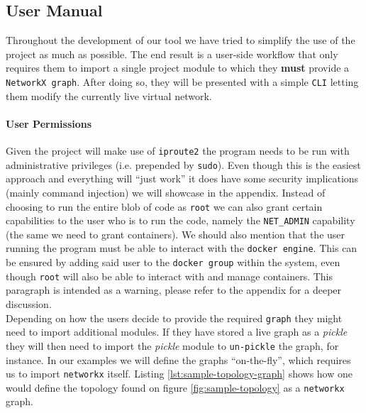         \subsection{User Manual} \label{sec:user-manual}
            Throughout the development of our tool we have tried to simplify the use of the project as much as possible. The end result is a user-side workflow that only requires them to import a single project module to which they \textbf{must} provide a \texttt{NetworkX graph}. After doing so, they will be presented with a simple \texttt{CLI} letting them modify the currently live virtual network.\\

            \paragraph{User Permissions}
                Given the project will make use of \texttt{iproute2} the program needs to be run with administrative privileges (i.e. prepended by \texttt{sudo}). Even though this is the easiest approach and everything will ``just work'' it does have some security implications (mainly command injection) we will showcase in the appendix. Instead of choosing to run the entire blob of code as \texttt{root} we can also grant certain capabilities to the user who is to run the code, namely the \texttt{NET\_ADMIN} capability (the same we need to grant containers). We should also mention that the user running the program must be able to interact with the \texttt{docker engine}. This can be ensured by adding said user to the \texttt{docker group} within the system, even though \texttt{root} will also be able to interact with and manage containers. This paragraph is intended as a warning, please refer to the appendix for a deeper discussion.\\

            Depending on how the users decide to provide the required \texttt{graph} they might need to import additional modules. If they have stored a live graph as a \textit{pickle} \cite{bib:python-pickle} they will then need to import the \textit{pickle} module to \texttt{un-pickle} the graph, for instance. In our examples we will define the graphs ``on-the-fly'', which requires us to import \texttt{networkx} itself. Listing \ref{lst:sample-topology-graph} shows how one would define the topology found on figure \ref{fig:sample-topology} as a \texttt{networkx} graph.\\


